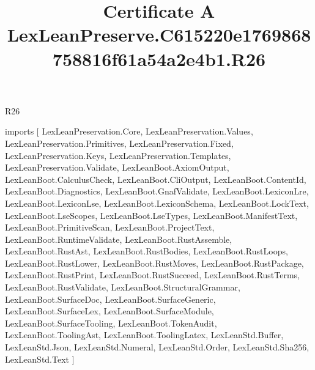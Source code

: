 \begin{lexlean}{R26}
\title{Certificate A LexLeanPreserve.C615220e1769868758816f61a54a2e4b1.R26}
\begin{coremodule}
imports [
  LexLeanPreservation.Core,
  LexLeanPreservation.Values,
  LexLeanPreservation.Primitives,
  LexLeanPreservation.Fixed,
  LexLeanPreservation.Keys,
  LexLeanPreservation.Templates,
  LexLeanPreservation.Validate,
  LexLeanBoot.AxiomOutput,
  LexLeanBoot.CalculusCheck,
  LexLeanBoot.CliOutput,
  LexLeanBoot.ContentId,
  LexLeanBoot.Diagnostics,
  LexLeanBoot.GnafValidate,
  LexLeanBoot.LexiconLre,
  LexLeanBoot.LexiconLse,
  LexLeanBoot.LexiconSchema,
  LexLeanBoot.LockText,
  LexLeanBoot.LseScopes,
  LexLeanBoot.LseTypes,
  LexLeanBoot.ManifestText,
  LexLeanBoot.PrimitiveScan,
  LexLeanBoot.ProjectText,
  LexLeanBoot.RuntimeValidate,
  LexLeanBoot.RustAssemble,
  LexLeanBoot.RustAst,
  LexLeanBoot.RustBodies,
  LexLeanBoot.RustLoops,
  LexLeanBoot.RustLower,
  LexLeanBoot.RustMoves,
  LexLeanBoot.RustPackage,
  LexLeanBoot.RustPrint,
  LexLeanBoot.RustSucceed,
  LexLeanBoot.RustTerms,
  LexLeanBoot.RustValidate,
  LexLeanBoot.StructuralGrammar,
  LexLeanBoot.SurfaceDoc,
  LexLeanBoot.SurfaceGeneric,
  LexLeanBoot.SurfaceLex,
  LexLeanBoot.SurfaceModule,
  LexLeanBoot.SurfaceTooling,
  LexLeanBoot.TokenAudit,
  LexLeanBoot.ToolingAst,
  LexLeanBoot.ToolingLatex,
  LexLeanStd.Buffer,
  LexLeanStd.Json,
  LexLeanStd.Numeral,
  LexLeanStd.Order,
  LexLeanStd.Sha256,
  LexLeanStd.Text
]


\end{coremodule}
\end{lexlean}
